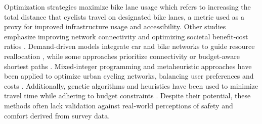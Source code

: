 \documentclass[lettersize,journal]{IEEEtran}
\begin{document}
Optimization strategies maximize bike lane usage \cite{mesbah2012bilevel, smith2012mathematical} which refers to increasing the total distance that cyclists travel on designated bike lanes, a metric used as a proxy for improved infrastructure usage and accessibility.  Other studies emphasize improving network connectivity and optimizing societal benefit-cost ratios \cite{paulsen2023societally, duthie2014optimization}. Demand-driven models integrate car and bike networks to guide resource reallocation \cite{steinacker2022demand}, while some approaches prioritize connectivity or budget-aware shortest paths \cite{duthie2014optimization}. Mixed-integer programming and metaheuristic approaches have been applied to optimize urban cycling networks, balancing user preferences and costs \cite{mauttone2017bicycle, lim2022bicycle}. Additionally, genetic algorithms and heuristics have been used to minimize travel time while adhering to budget constraints \cite{shui2019optimization}. Despite their potential, these methods often lack validation against real-world perceptions of safety and comfort derived from survey data.



\end{document}
